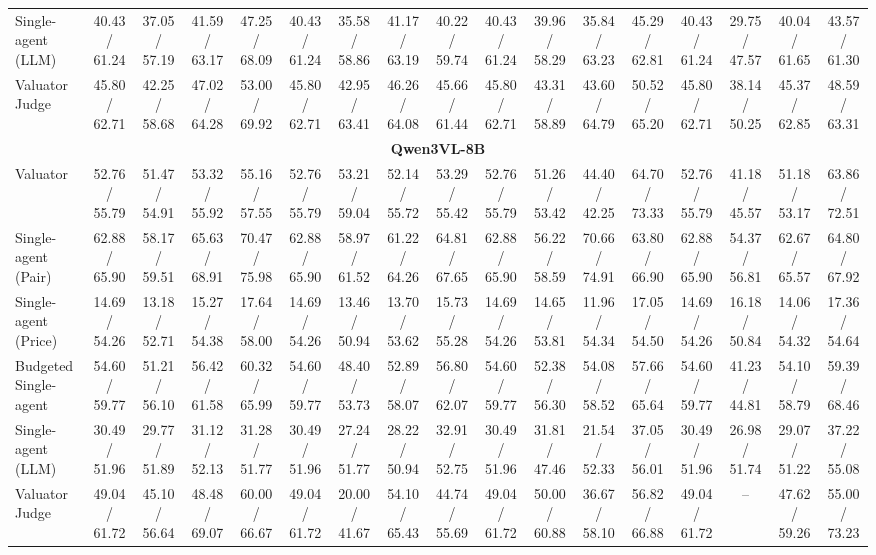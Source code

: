 \begin{table}[!t]
{\begin{tabular}{lcccccccccccccccc}
Single-agent (LLM)           & 40.43 / 61.24 & 37.05 / 57.19 & 41.59 / 63.17 & 47.25 / 68.09 & 40.43 / 61.24 & 35.58 / 58.86 & 41.17 / 63.19 & 40.22 / 59.74 & 40.43 / 61.24 & 39.96 / 58.29 & 35.84 / 63.23 & 45.29 / 62.81 & 40.43 / 61.24 & 29.75 / 47.57 & 40.04 / 61.65 & 43.57 / 61.30 \\
Valuator Judge               & 45.80 / 62.71 & 42.25 / 58.68 & 47.02 / 64.28 & 53.00 / 69.92 & 45.80 / 62.71 & 42.95 / 63.41 & 46.26 / 64.08 & 45.66 / 61.44 & 45.80 / 62.71 & 43.31 / 58.89 & 43.60 / 64.79 & 50.52 / 65.20 & 45.80 / 62.71 & 38.14 / 50.25 & 45.37 / 62.85 & 48.59 / 63.31 \\
\midrule
\multicolumn{17}{c}{\textbf{Qwen3VL-8B}} \\
\midrule
Valuator                     & 52.76 / 55.79 & 51.47 / 54.91 & 53.32 / 55.92 & 55.16 / 57.55 & 52.76 / 55.79 & 53.21 / 59.04 & 52.14 / 55.72 & 53.29 / 55.42 & 52.76 / 55.79 & 51.26 / 53.42 & 44.40 / 42.25 & 64.70 / 73.33 & 52.76 / 55.79 & 41.18 / 45.57 & 51.18 / 53.17 & 63.86 / 72.51 \\
Single-agent (Pair)          & 62.88 / 65.90 & 58.17 / 59.51 & 65.63 / 68.91 & 70.47 / 75.98 & 62.88 / 65.90 & 58.97 / 61.52 & 61.22 / 64.26 & 64.81 / 67.65 & 62.88 / 65.90 & 56.22 / 58.59 & 70.66 / 74.91 & 63.80 / 66.90 & 62.88 / 65.90 & 54.37 / 56.81 & 62.67 / 65.57 & 64.80 / 67.92 \\
Single-agent (Price)         & 14.69 / 54.26 & 13.18 / 52.71 & 15.27 / 54.38 & 17.64 / 58.00 & 14.69 / 54.26 & 13.46 / 50.94 & 13.70 / 53.62 & 15.73 / 55.28 & 14.69 / 54.26 & 14.65 / 53.81 & 11.96 / 54.34 & 17.05 / 54.50 & 14.69 / 54.26 & 16.18 / 50.84 & 14.06 / 54.32 & 17.36 / 54.64 \\
Budgeted Single-agent        & 54.60 / 59.77 & 51.21 / 56.10 & 56.42 / 61.58 & 60.32 / 65.99 & 54.60 / 59.77 & 48.40 / 53.73 & 52.89 / 58.07 & 56.80 / 62.07 & 54.60 / 59.77 & 52.38 / 56.30 & 54.08 / 58.52 & 57.66 / 65.64 & 54.60 / 59.77 & 41.23 / 44.81 & 54.10 / 58.79 & 59.39 / 68.46 \\
Single-agent (LLM)           & 30.49 / 51.96 & 29.77 / 51.89 & 31.12 / 52.13 & 31.28 / 51.77 & 30.49 / 51.96 & 27.24 / 51.77 & 28.22 / 50.94 & 32.91 / 52.75 & 30.49 / 51.96 & 31.81 / 47.46 & 21.54 / 52.33 & 37.05 / 56.01 & 30.49 / 51.96 & 26.98 / 51.74 & 29.07 / 51.22 & 37.22 / 55.08 \\
Valuator Judge               & 49.04 / 61.72 & 45.10 / 56.64 & 48.48 / 69.07 & 60.00 / 66.67 & 49.04 / 61.72 & 20.00 / 41.67 & 54.10 / 65.43 & 44.74 / 55.69 & 49.04 / 61.72 & 50.00 / 60.88 & 36.67 / 58.10 & 56.82 / 66.88 & 49.04 / 61.72 & -- & 47.62 / 59.26 & 55.00 / 73.23 \\

\end{tabular}}
\end{table}
